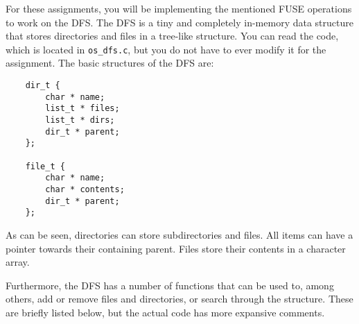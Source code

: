 \documentclass [a4,twoside,11pt] {article}
\begin{document}
    For these assignments, you will be implementing the mentioned FUSE operations to work on the DFS. The DFS is a tiny and completely in-memory data structure that stores directories and files in a tree-like structure. You can read the code, which is located in \texttt{os\_dfs.c}, but you do not have to ever modify it for the assignment. The basic structures of the DFS are:

    \begin{verbatim}
    dir_t {
        char * name;
        list_t * files;
        list_t * dirs;
        dir_t * parent;
    };

    file_t {
        char * name;
        char * contents;
        dir_t * parent;
    };\end{verbatim}

    As can be seen, directories can store subdirectories and files. All items can have a pointer towards their containing parent. Files store their contents in a character array.

    Furthermore, the DFS has a number of functions that can be used to, among others, add or remove files and directories, or search through the structure. These are briefly listed below, but the actual code has more expansive comments.
\end{document}
